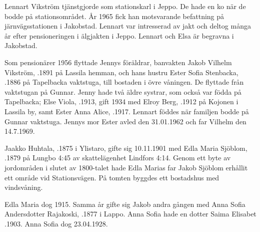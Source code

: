Lennart Vikström tjänstgjorde som stationskarl i Jeppo. De hade en ko	när de bodde på stationsområdet. År 1965 fick han motsvarande	befattning på järnvägsstationen i Jakobstad. Lennart var intresserad av	jakt och deltog många år efter pensioneringen i älgjakten i Jeppo. Lennart och Elsa är begravna i Jakobstad.

Som pensionärer 1956 flyttade Jennys föräldrar, banvakten Jakob	Vilhelm Vikström, .1891 på Lassila hemman, och	hans hustru Ester Sofia Stenbacka, .1886 på Tapelbacka	vaktstuga, till bostaden i övre våningen. De flyttade från vaktstugan på Gunnar. Jenny hade två äldre systrar, som också var födda på Tapelbacka; Else Viola, .1913, gift 1934 med Elroy Berg, .1912 på Kojonen i Lassila by, samt Ester Anna Alice, .1917. Lennart föddes när familjen bodde på Gunnar vaktstuga. Jennys mor Ester avled den 31.01.1962 och far Vilhelm den 14.7.1969.


Jaakko Huhtala, .1875 i Ylistaro, gifte sig 10.11.1901 med Edla Maria Sjöblom, .1879 på Lungbo 4:45 av skattelägenhet Lindfors 4:14. Genom ett byte av jordområden i slutet av 1800-talet hade Edla Marias far Jakob Sjöblom erhållit ett område vid Stationsvägen. På tomten byggdes ett bostadshus med vindsvåning.
\begin{jhchildren}
  \item {}
  \item {}
  \item {}
  \item {}
  \item {}
\end{jhchildren}
Edla Maria dog 1915. Samma år gifte sig Jakob andra gången med Anna Sofia Andersdotter Rajakoski, .1877 i Lappo. Anna Sofia hade en dotter Saima Elisabet .1903. Anna Sofia dog 23.04.1928.


